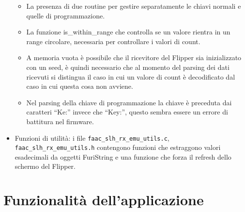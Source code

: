 \begin{itemize}
  \begin{itemize}
    \item La presenza di due routine per gestire separatamente le chiavi normali e quelle di programmazione.
    \item La funzione is\_within\_range che controlla se un valore rientra in un range circolare, necessaria per controllare i valori di count.
    \item A memoria vuota è possibile che il ricevitore del Flipper sia inizializzato con un seed, è quindi necessario che al momento del parsing dei dati ricevuti si distingua il caso in cui un valore di count è decodificato dal caso in cui questa cosa non avviene.
    \item Nel parsing della chiave di programmazione la chiave è preceduta dai caratteri “Ke:” invece che “Key:”, questo sembra essere un errore di battitura nel firmware.
  \end{itemize}
  \item Funzioni di utilità: i file \texttt{faac\_slh\_rx\_emu\_utils.c}, \texttt{faac\_slh\_rx\_emu\_utils.h} contengono funzioni che estraggono valori esadecimali da oggetti FuriString e una funzione che forza il refresh dello schermo del Flipper.
\end{itemize}

\section{Funzionalità dell'applicazione}
\label{sec:func_devel}

